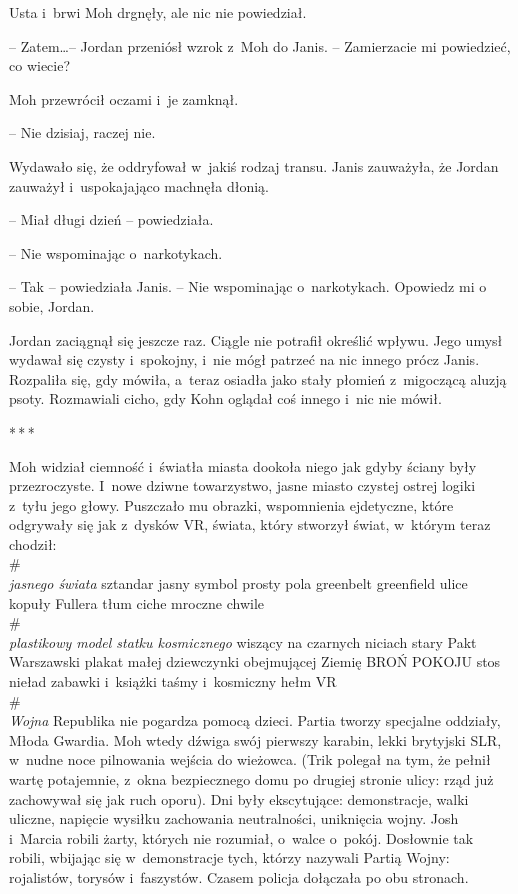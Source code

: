 \documentclass[oneside,polish,11pt,sfheadings]{mwbk}
\newcommand{\threeast}{\bigskip\par\centerline{*\,*\,*}\medskip\par}%
\begin{document}
Usta i~brwi Moh drgnęły, ale nic nie powiedział.

-- Zatem\ldots -- Jordan przeniósł wzrok z~Moh do Janis. -- Zamierzacie mi
powiedzieć, co wiecie?

Moh przewrócił oczami i~je zamknął. 

-- Nie dzisiaj, raczej nie.

Wydawało się, że oddryfował w~jakiś rodzaj transu. Janis zauważyła, że
Jordan zauważył i~uspokajająco machnęła dłonią.

-- Miał długi dzień -- powiedziała.

-- Nie wspominając o~narkotykach.

-- Tak -- powiedziała Janis. -- Nie wspominając o~narkotykach. Opowiedz mi
o sobie, Jordan.

Jordan zaciągnął się jeszcze raz. Ciągle nie potrafił określić wpływu.
Jego umysł wydawał się czysty i~spokojny, i~nie mógł patrzeć na nic
innego prócz Janis. Rozpaliła się, gdy mówiła, a~teraz osiadła jako
stały płomień z~migoczącą aluzją psoty. Rozmawiali cicho, gdy Kohn
oglądał coś innego i~nic nie mówił.

\threeast

Moh widział ciemność i~światła miasta dookoła niego jak gdyby ściany
były przezroczyste. I~nowe dziwne towarzystwo, jasne miasto czystej
ostrej logiki z~tyłu jego głowy. Puszczało mu obrazki, wspomnienia
ejdetyczne, które odgrywały się jak z~dysków VR, świata, który stworzył
świat, w~którym teraz chodził:\\

\#\\

\emph{jasnego świata} sztandar jasny symbol prosty pola greenbelt
greenfield ulice kopuły Fullera tłum ciche mroczne chwile\\

\#\\

\emph{plastikowy model statku kosmicznego} wiszący na czarnych niciach
stary Pakt Warszawski plakat małej dziewczynki obejmującej Ziemię BROŃ
POKOJU stos nieład zabawki i~książki taśmy i~kosmiczny hełm VR\\

\#\\

\emph{Wojna} Republika nie pogardza pomocą dzieci. Partia tworzy
specjalne oddziały, Młoda Gwardia. Moh wtedy dźwiga swój pierwszy
karabin, lekki brytyjski SLR, w~nudne noce pilnowania wejścia do
wieżowca. (Trik polegał na tym, że pełnił wartę potajemnie, z~okna
bezpiecznego domu po drugiej stronie ulicy: rząd już zachowywał się jak
ruch oporu). Dni były ekscytujące: demonstracje, walki uliczne, napięcie
wysiłku zachowania neutralności, uniknięcia wojny. Josh i~Marcia robili
żarty, których nie rozumiał, o~walce o~pokój. Dosłownie tak robili,
wbijając się w~demonstracje tych, którzy nazywali Partią Wojny:
rojalistów, torysów i~faszystów. Czasem policja dołączała po obu
stronach.
\end{document}
